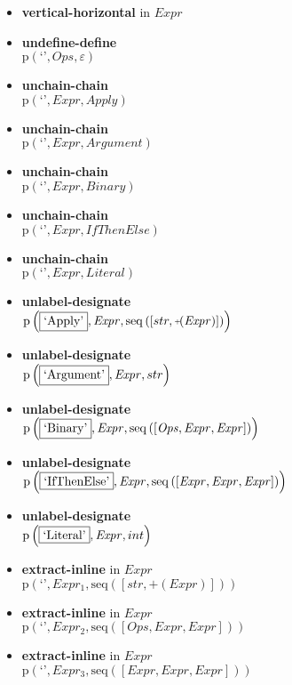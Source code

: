 {\begin{itemize}
\item \textbf{vertical-horizontal}  in $\mathit{Expr}$
\item \textbf{undefine-define}\\$\mathrm{p}\left(\text{`'},\mathit{Ops},\varepsilon\right)$
\item \textbf{unchain-chain}\\$\mathrm{p}\left(\text{`'},\mathit{Expr},\mathit{Apply}\right)$
\item \textbf{unchain-chain}\\$\mathrm{p}\left(\text{`'},\mathit{Expr},\mathit{Argument}\right)$
\item \textbf{unchain-chain}\\$\mathrm{p}\left(\text{`'},\mathit{Expr},\mathit{Binary}\right)$
\item \textbf{unchain-chain}\\$\mathrm{p}\left(\text{`'},\mathit{Expr},\mathit{IfThenElse}\right)$
\item \textbf{unchain-chain}\\$\mathrm{p}\left(\text{`'},\mathit{Expr},\mathit{Literal}\right)$
\item \textbf{unlabel-designate}\\$\mathrm{p}\left(\fbox{\text{`Apply'}},\mathit{Expr},\mathrm{seq}\left(\left[str, \plus \left(\mathit{Expr}\right)\right]\right)\right)$
\item \textbf{unlabel-designate}\\$\mathrm{p}\left(\fbox{\text{`Argument'}},\mathit{Expr},str\right)$
\item \textbf{unlabel-designate}\\$\mathrm{p}\left(\fbox{\text{`Binary'}},\mathit{Expr},\mathrm{seq}\left(\left[\mathit{Ops}, \mathit{Expr}, \mathit{Expr}\right]\right)\right)$
\item \textbf{unlabel-designate}\\$\mathrm{p}\left(\fbox{\text{`IfThenElse'}},\mathit{Expr},\mathrm{seq}\left(\left[\mathit{Expr}, \mathit{Expr}, \mathit{Expr}\right]\right)\right)$
\item \textbf{unlabel-designate}\\$\mathrm{p}\left(\fbox{\text{`Literal'}},\mathit{Expr},int\right)$
\item \textbf{extract-inline}  in $\mathit{Expr}$\\$\mathrm{p}\left(\text{`'},\mathit{Expr_1},\mathrm{seq}\left(\left[str, \plus \left(\mathit{Expr}\right)\right]\right)\right)$
\item \textbf{extract-inline}  in $\mathit{Expr}$\\$\mathrm{p}\left(\text{`'},\mathit{Expr_2},\mathrm{seq}\left(\left[\mathit{Ops}, \mathit{Expr}, \mathit{Expr}\right]\right)\right)$
\item \textbf{extract-inline}  in $\mathit{Expr}$\\$\mathrm{p}\left(\text{`'},\mathit{Expr_3},\mathrm{seq}\left(\left[\mathit{Expr}, \mathit{Expr}, \mathit{Expr}\right]\right)\right)$
\end{itemize}}

